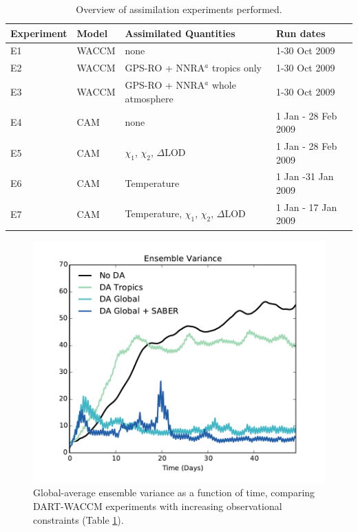 \begin{table}
\caption{Overview of assimilation experiments performed.}
\centering
\begin{tabular}{p{2cm}p{2cm}p{6cm}p{4cm}}
	Experiment& Model &  Assimilated Quantities  & Run dates \\
\hline
E1 & WACCM &	none   & 1-30 Oct 2009	\\
E2 & WACCM &	GPS-RO + NNRA$^a$ tropics only & 1-30 Oct 2009	\\
E3 & WACCM &	GPS-RO + NNRA$^a$ whole atmosphere  & 1-30 Oct 2009	\\
E4 & CAM	&	none &  1 Jan - 28 Feb 2009 \\
E5 & CAM &	$\chi_1$, $\chi_2$, $\Delta$LOD	& 1 Jan - 28 Feb 2009 \\
E6 & CAM &	Temperature	& 1 Jan -31 Jan 2009	\\
E7 & CAM &	Temperature, $\chi_1$, $\chi_2$, $\Delta$LOD	& 1 Jan - 17 Jan 2009\\
\hline
\end{tabular}
\label{tab:expts}
\end{table}
\clearpage

 \begin{figure}
	 \includegraphics[width=\textwidth]{Paper_figures/ERPDA_paper_evalvariable_state_space.pdf}
	 \caption{Global-average ensemble variance as a function of time, comparing DART-WACCM experiments with increasing observational constraints (Table \ref{tab:expts}).}
	 \label{fig:evalvariable_state}
\end{figure}

